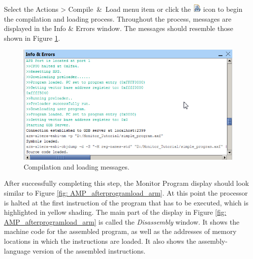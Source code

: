 \documentclass[11pt, twoside, pdftex]{article}
\begin{document}
Select the \textsf{Actions > Compile~\&~Load} menu item
or click the \includegraphics{toolbar/compile_load.png} icon to
begin the compilation and loading process.  
Throughout the process, messages are displayed in 
the \textsf{Info \& Errors} window. The messages should resemble
those shown in Figure \ref{fig:AMP_compilationmessages_arm}.

\begin{figure}[H]
   \begin{center}
      \includegraphics[scale=1]{screenshots/figure17.png}
   \end{center}
   \caption{Compilation and loading messages.} 
   \label{fig:AMP_compilationmessages_arm}
\end{figure}

After successfully completing this step, the Monitor Program display should look similar to Figure \ref{fig: AMP_afterprogramload_arm}. At this point the
processor is halted at the first instruction of the program that
has to be executed, which is highlighted in yellow shading.
The main part of the display in Figure \ref{fig: AMP_afterprogramload_arm} is called the
{\it Disassembly} window. 
It shows the machine code for the assembled program,
as well as the addresses of memory locations in which the
instructions are loaded. It also shows the assembly-language
version of the assembled instructions.
\end{document}

